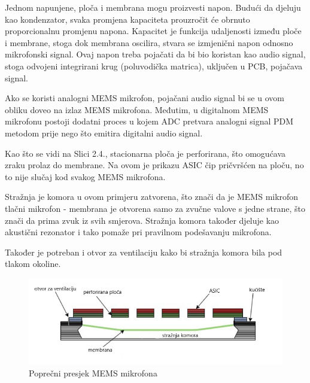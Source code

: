 Jednom napunjene, ploča i membrana mogu proizvesti napon. Budući da djeluju kao kondenzator, svaka promjena kapaciteta prouzročit će obrnuto proporcionalnu promjenu napona. Kapacitet je funkcija udaljenosti između ploče i membrane, stoga dok membrana oscilira, stvara se izmjenični napon odnosno mikrofonski signal. Ovaj napon treba pojačati da bi bio koristan kao audio signal, stoga odvojeni integrirani krug (poluvodička matrica), uključen u PCB, pojačava signal.

Ako se koristi analogni MEMS mikrofon, pojačani audio signal bi se u ovom obliku doveo na izlaz MEMS mikrofona.  Međutim, u digitalnom MEMS mikrofonu postoji dodatni proces u kojem ADC pretvara analogni signal PDM metodom prije nego što emitira digitalni audio signal.

Kao što se vidi na Slici 2.4., stacionarna ploča je perforirana, što omogućava zraku prolaz do membrane. Na ovom je prikazu ASIC čip pričvršćen na ploču, no to nije slučaj kod svakog MEMS mikrofona. 

Stražnja je komora u ovom primjeru zatvorena, što znači da je MEMS mikrofon tlačni mikrofon - membrana je otvorena samo za zvučne valove s jedne strane, što znači da prima zvuk iz svih smjerova. Stražnja komora također djeluje kao akustični rezonator i tako pomaže pri pravilnom podešavanju mikrofona.

Također je potreban i otvor za ventilaciju kako bi stražnja komora bila pod tlakom okoline.

\begin{figure}[ht]
	\includegraphics[width=\linewidth]{imgs/mems_mic}
	\caption{Poprečni presjek MEMS mikrofona}
	\label{fig:mems-mic}
\end{figure}